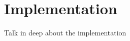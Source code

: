 \documentclass[../document.tex]{subfiles}
\begin{document}
\section{Implementation}
Talk in deep about the implementation

\end{document}
